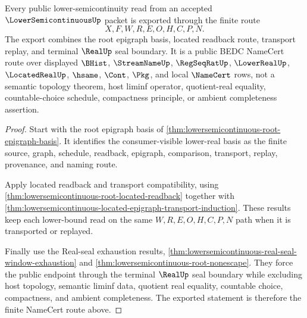 \begin{theorem}
\label{thm:lowersemicontinuous-epigraph-public-export}
Every public lower-semicontinuity read from an accepted $\LowerSemicontinuousUp$ packet is exported through the finite route
$$
X,F,W,R,E,O,H,C,P,N .
$$
The export combines the root epigraph basis, located readback route, transport replay, and terminal $\RealUp$ seal boundary. It is a public BEDC NameCert route over displayed $\BHist$, $\StreamNameUp$, $\RegSeqRatUp$, $\LowerRealUp$, $\LocatedRealUp$, $\hsame$, $\Cont$, $\Pkg$, and local $\NameCert$ rows, not a semantic topology theorem, host liminf operator, quotient-real equality, countable-choice schedule, compactness principle, or ambient completeness assertion.
\end{theorem}
\begin{proof}
Start with the root epigraph basis of \autoref{thm:lowersemicontinuous-root-epigraph-basis}. It identifies the consumer-visible lower-real basis as the finite source, graph, schedule, readback, epigraph, comparison, transport, replay, provenance, and naming route.

Apply located readback and transport compatibility, using \autoref{thm:lowersemicontinuous-root-located-readback} together with \autoref{thm:lowersemicontinuous-located-epigraph-transport-induction}. These results keep each lower-bound read on the same $W,R,E,O,H,C,P,N$ path when it is transported or replayed.

Finally use the Real-seal exhaustion results, \autoref{thm:lowersemicontinuous-real-seal-window-exhaustion} and \autoref{thm:lowersemicontinuous-root-nonescape}. They force the public endpoint through the terminal $\RealUp$ seal boundary while excluding host topology, semantic liminf data, quotient real equality, countable choice, compactness, and ambient completeness. The exported statement is therefore the finite NameCert route above.
\end{proof}

